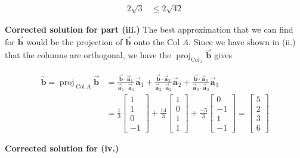 \documentclass[letter,11pt]{article}
\theoremstyle{definition}
\begin{document}
\begin{tcolorbox}[boxrule=1mm,enhanced jigsaw, breakable,before=\hfill,after=\hfill,adjusted title={Problem 5 solutions}]
\begin{enumerate}[label = \roman*.]
\begin{align*}
            2\sqrt{3} & \leq 2\sqrt{42}
        \end{align*}
    \end{enumerate}
    \tcblower
    \textbf{Corrected solution for part (iii.)}
The best approximation that we can find for $\vec{\boldsymbol{b}}$ would be the projection of $\vec{\boldsymbol{b}}$ onto the Col $A$. Since we have shown in (ii.) that the columns are orthogonal, we have the $\operatorname{proj}_{\operatorname{Col}_A} \vec{\boldsymbol{b}}$ gives

\begin{align*}
\hat{\boldsymbol{b}}=\operatorname{proj}_{\operatorname{Col } A} \vec{\boldsymbol{b}} & =\frac{\vec{\boldsymbol{b}} \cdot \vec{\boldsymbol{a}}_1}{\vec{\boldsymbol{a}}_1 \cdot \vec{\boldsymbol{a}}_1} \vec{\boldsymbol{a}}_1+\frac{\vec{\boldsymbol{b}} \cdot \vec{\boldsymbol{a}}_2}{\vec{\boldsymbol{a}}_2 \cdot \vec{\boldsymbol{a}}_2} \vec{\boldsymbol{a}}_2+\frac{\vec{\boldsymbol{b}} \cdot \vec{\boldsymbol{a}}_3}{\vec{\boldsymbol{a}}_3 \cdot \vec{\boldsymbol{a}}_3} \vec{\boldsymbol{a}}_3 \\
& =\frac{1}{3}\begin{bmatrix}
1 \\
1 \\
0 \\
-1
\end{bmatrix}+\frac{14}{3}\begin{bmatrix}
1 \\
0 \\
1 \\
1
\end{bmatrix}+\frac{-5}{3}\begin{bmatrix}
0 \\
-1 \\
1 \\
-1
\end{bmatrix}=\begin{bmatrix}
5 \\
2 \\
3 \\
6
\end{bmatrix}
\end{align*}

\textbf{Corrected solution for (iv.)}


\end{tcolorbox}
\end{document}
